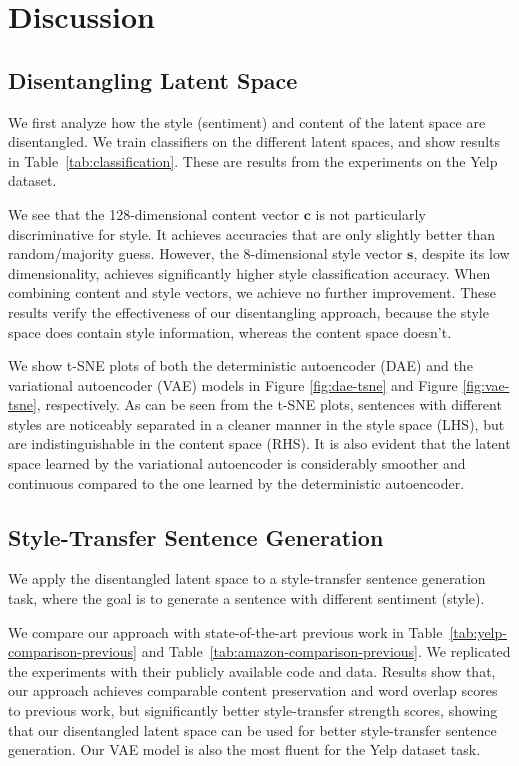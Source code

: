 \documentclass[11pt,a4paper]{article}
\begin{document}
\section{Discussion}

\subsection{Disentangling Latent Space}

We first analyze how the style (sentiment) and content of the latent space are disentangled. We train classifiers on the different latent spaces, and show results in Table~\ref{tab:classification}. These are results from the experiments on the Yelp dataset.

We see that the 128-dimensional content vector $\bm c$ is not particularly discriminative for style. It achieves accuracies that are only slightly better than random/majority guess. However, the 8-dimensional style vector $\bm s$, despite its low dimensionality, achieves significantly higher style classification accuracy. When combining content and style vectors, we achieve no further improvement. These results verify the effectiveness of our disentangling approach, because the style space does contain style information, whereas the content space doesn't.

We show t-SNE plots of both the deterministic autoencoder (DAE) and the variational autoencoder (VAE) models in Figure \ref{fig:dae-tsne} and Figure \ref{fig:vae-tsne}, respectively. As can be seen from the t-SNE plots, sentences with different styles are noticeably separated in a cleaner manner in the style space (LHS), but are indistinguishable in the content space (RHS). It is also evident that the latent space learned by the variational autoencoder is considerably smoother and continuous compared to the one learned by the deterministic autoencoder.


\subsection{Style-Transfer Sentence Generation}

We apply the disentangled latent space to a style-transfer sentence generation task, where the goal is to generate a sentence with different sentiment (style).

We compare our approach with state-of-the-art previous work in Table~\ref{tab:yelp-comparison-previous} and Table~\ref{tab:amazon-comparison-previous}. We replicated the experiments with their publicly available code and data. Results show that, our approach achieves comparable content preservation and word overlap scores to previous work, but significantly better style-transfer strength scores, showing that our disentangled latent space can be used for better style-transfer sentence generation. Our VAE model is also the most fluent for the Yelp dataset task.
\end{document}
